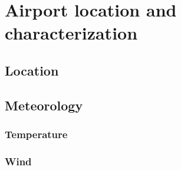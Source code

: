 \chapter{Airport location and characterization}

	\section{Location}

	\section{Meteorology}
		\subsection{Temperature}
		\subsection{Wind}